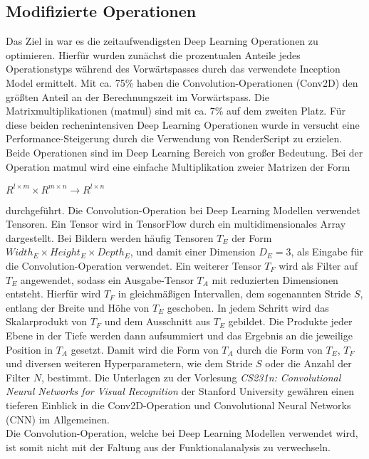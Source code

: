 \subsection{Modifizierte Operationen}
\label{subsec:modoperationen}
Das Ziel in \cite{rstensorflow2017} war es die zeitaufwendigsten Deep Learning Operationen zu optimieren. Hierfür wurden zunächst die prozentualen Anteile jedes Operationstyps während des Vorwärtspasses durch das verwendete Inception Model ermittelt. Mit ca. 75\% haben die Convolution-Operationen (Conv2D) den größten Anteil an der Berechnungszeit im Vorwärtspass. Die Matrixmultiplikationen (matmul) sind mit ca. 7\% auf dem zweiten Platz. Für diese beiden rechenintensiven Deep Learning Operationen wurde in \cite{rstensorflow2017} versucht eine Performance-Steigerung durch die Verwendung von RenderScript zu erzielen. 
\\
Beide Operationen sind im Deep Learning Bereich von großer Bedeutung. Bei der Operation matmul wird eine einfache Multiplikation zweier Matrizen der Form
\begin{center}
	$R^{l \times m} \times R^{m \times n} \rightarrow R^{l \times n}$
\end{center}
durchgeführt. Die Convolution-Operation bei Deep Learning Modellen verwendet Tensoren. Ein Tensor wird in TensorFlow durch ein multidimensionales Array dargestellt. Bei Bildern werden häufig Tensoren $T_{E}$ der Form $Width_{E} \times Height_{E} \times Depth_{E}$, und damit einer Dimension $D_{E} = 3$, als Eingabe für die Convolution-Operation verwendet. Ein weiterer Tensor $T_{F}$ wird als Filter auf $T_{E}$ angewendet, sodass ein Ausgabe-Tensor $T_{A}$ mit reduzierten Dimensionen entsteht. Hierfür wird $T_{F}$ in gleichmäßigen Intervallen, dem sogenannten Stride $S$, entlang der Breite und Höhe von $T_{E}$ geschoben. In jedem Schritt wird das Skalarprodukt von $T_{F}$ und dem Ausschnitt aus $T_{E}$ gebildet. Die Produkte jeder Ebene in der Tiefe werden dann aufsummiert und das Ergebnis an die jeweilige Position in $T_{A}$ gesetzt. Damit wird die Form von $T_{A}$ durch die Form von $T_{E}$, $T_{F}$ und diversen weiteren Hyperparametern, wie dem Stride $S$ oder die Anzahl der Filter $N$, bestimmt. Die Unterlagen zu der Vorlesung \textit{CS231n: Convolutional Neural Networks for Visual Recognition} der Stanford University \cite{stanford-CS231n} gewähren einen tieferen Einblick in die Conv2D-Operation und Convolutional Neural Networks (CNN) im Allgemeinen. \\
Die Convolution-Operation, welche bei Deep Learning Modellen verwendet wird, ist somit nicht mit der Faltung aus der Funktionalanalysis zu verwechseln. 


